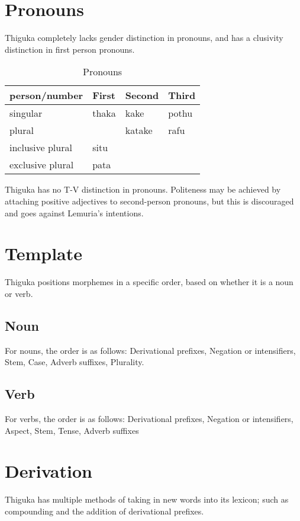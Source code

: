 \section{Pronouns}
Thiguka completely lacks gender distinction in pronouns, and has a clusivity distinction in first person pronouns.

\begin{table}[h!]
    \centering
    \caption{Pronouns}
    \begin{tabularx}{15cm}{|X|X|X|X|}
        \hline
        person/number & \textbf{First} & \textbf{Second} & \textbf{Third} \\
        \hline
        singular & thaka & kake & pothu \\
        plural   & & katake & rafu \\
        inclusive plural & situ & & \\
        exclusive plural & pata & & \\
        \hline
    \end{tabularx}
\end{table}

Thiguka has no T-V distinction in pronouns. Politeness may be achieved by attaching positive adjectives to second-person pronouns, but this is discouraged and goes against Lemuria's intentions.




\section{Template}
Thiguka positions morphemes in a specific order, based on whether it is a noun or verb.

\subsection{Noun}
For nouns, the order is as follows: Derivational prefixes, Negation or intensifiers, Stem, Case, Adverb suffixes, Plurality.

\subsection{Verb}
For verbs, the order is as follows: Derivational prefixes, Negation or intensifiers, Aspect, Stem, Tense, Adverb suffixes

\section{Derivation}
Thiguka has multiple methods of taking in new words into its lexicon; such as compounding and the addition of derivational prefixes.

